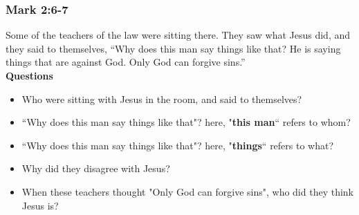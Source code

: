 \newpage
\vspace{-.3cm}
\subsubsection{\large{Mark 2:6-7}}
Some of the teachers of the law were sitting there. They saw what Jesus did, and they said to themselves, “Why does this man say things like that? He is saying things that are against God. Only God can forgive sins.” \\
\vspace{.2cm}
\textbf{Questions}\vspace{-.5cm}
\begin{itemize}[noitemsep]
\item Who were sitting with Jesus in the room, and said to themselves?
\item“Why does this man say things like that"? here, "\textbf{this man}“ refers to whom?
\item“Why does this man say things like that"? here, "\textbf{things}“ refers to what?
\item Why did they disagree with Jesus?
\item When these teachers thought "Only God can forgive sins", who did they think Jesus is?
\end{itemize}


\vspace{-.2cm}
